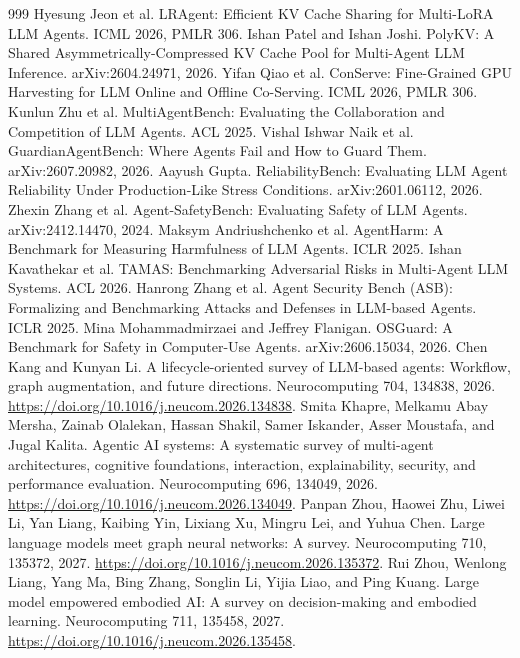 \documentclass[preprint,12pt]{elsarticle}
\begin{document}
\begin{thebibliography}{999}
 Hyesung Jeon et al. LRAgent: Efficient KV Cache Sharing for Multi-LoRA LLM Agents. ICML 2026, PMLR 306.
 Ishan Patel and Ishan Joshi. PolyKV: A Shared Asymmetrically-Compressed KV Cache Pool for Multi-Agent LLM Inference. arXiv:2604.24971, 2026.
 Yifan Qiao et al. ConServe: Fine-Grained GPU Harvesting for LLM Online and Offline Co-Serving. ICML 2026, PMLR 306.
 Kunlun Zhu et al. MultiAgentBench: Evaluating the Collaboration and Competition of LLM Agents. ACL 2025.
 Vishal Ishwar Naik et al. GuardianAgentBench: Where Agents Fail and How to Guard Them. arXiv:2607.20982, 2026.
 Aayush Gupta. ReliabilityBench: Evaluating LLM Agent Reliability Under Production-Like Stress Conditions. arXiv:2601.06112, 2026.
 Zhexin Zhang et al. Agent-SafetyBench: Evaluating Safety of LLM Agents. arXiv:2412.14470, 2024.
 Maksym Andriushchenko et al. AgentHarm: A Benchmark for Measuring Harmfulness of LLM Agents. ICLR 2025.
 Ishan Kavathekar et al. TAMAS: Benchmarking Adversarial Risks in Multi-Agent LLM Systems. ACL 2026.
 Hanrong Zhang et al. Agent Security Bench (ASB): Formalizing and Benchmarking Attacks and Defenses in LLM-based Agents. ICLR 2025.
 Mina Mohammadmirzaei and Jeffrey Flanigan. OSGuard: A Benchmark for Safety in Computer-Use Agents. arXiv:2606.15034, 2026.
 Chen Kang and Kunyan Li. A lifecycle-oriented survey of LLM-based agents: Workflow, graph augmentation, and future directions. Neurocomputing 704, 134838, 2026. \url{https://doi.org/10.1016/j.neucom.2026.134838}.
 Smita Khapre, Melkamu Abay Mersha, Zainab Olalekan, Hassan Shakil, Samer Iskander, Asser Moustafa, and Jugal Kalita. Agentic AI systems: A systematic survey of multi-agent architectures, cognitive foundations, interaction, explainability, security, and performance evaluation. Neurocomputing 696, 134049, 2026. \url{https://doi.org/10.1016/j.neucom.2026.134049}.
 Panpan Zhou, Haowei Zhu, Liwei Li, Yan Liang, Kaibing Yin, Lixiang Xu, Mingru Lei, and Yuhua Chen. Large language models meet graph neural networks: A survey. Neurocomputing 710, 135372, 2027. \url{https://doi.org/10.1016/j.neucom.2026.135372}.
 Rui Zhou, Wenlong Liang, Yang Ma, Bing Zhang, Songlin Li, Yijia Liao, and Ping Kuang. Large model empowered embodied AI: A survey on decision-making and embodied learning. Neurocomputing 711, 135458, 2027. \url{https://doi.org/10.1016/j.neucom.2026.135458}.

\end{thebibliography}
\end{document}
